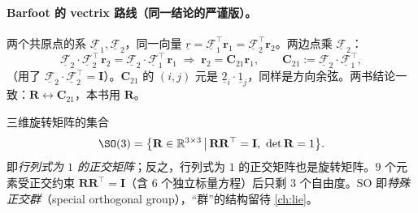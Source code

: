 \paragraph{Barfoot 的 vectrix 路线（同一结论的严谨版）。}两个共原点的系 $\underline{\mathcal{F}}_1,\underline{\mathcal{F}}_2$，同一向量 $\underline{r}=\underline{\mathcal{F}}_1^\top\mathbf{r}_1=\underline{\mathcal{F}}_2^\top\mathbf{r}_2$。两边点乘 $\underline{\mathcal{F}}_2$：
\begin{equation}
  \underline{\mathcal{F}}_2\cdot\underline{\mathcal{F}}_2^\top\,\mathbf{r}_2=\underline{\mathcal{F}}_2\cdot\underline{\mathcal{F}}_1^\top\,\mathbf{r}_1
  \;\Longrightarrow\;
  \mathbf{r}_2=\mathbf{C}_{21}\mathbf{r}_1,\qquad
  \mathbf{C}_{21}:=\underline{\mathcal{F}}_2\cdot\underline{\mathcal{F}}_1^\top,
\end{equation}
（用了 $\underline{\mathcal{F}}_2\cdot\underline{\mathcal{F}}_2^\top=\mathbf{I}$）。$\mathbf{C}_{21}$ 的 $(i,j)$ 元是 $\underline{2}_i\cdot\underline{1}_j$，同样是方向余弦。两书结论一致：$\mathbf{R}\leftrightarrow\mathbf{C}_{21}$，本书用 $\mathbf{R}$。

\begin{definition}[特殊正交群 $\SO(3)$]\label{def:so3-rep}
三维旋转矩阵的集合
\begin{equation}
  \SO(3)=\big\{\mathbf{R}\in\mathbb{R}^{3\times3}\,\big|\,\mathbf{R}\mathbf{R}^\top=\mathbf{I},\ \det\mathbf{R}=1\big\}.
  \label{eq:so3-def}
\end{equation}
即\emph{行列式为 $1$ 的正交矩阵}；反之，行列式为 $1$ 的正交矩阵也是旋转矩阵。$9$ 个元素受正交约束 $\mathbf{R}\mathbf{R}^\top=\mathbf{I}$（含 $6$ 个独立标量方程）后只剩 $3$ 个自由度。$\mathrm{SO}$ 即\emph{特殊正交群}（special orthogonal group），“群”的结构留待 \cref{ch:lie}。
\end{definition}

